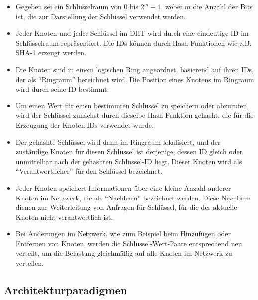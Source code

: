 \documentclass[../vs-script-first-v01.tex]{subfiles}
\begin{document}
\begin{itemize}
\item Gegeben sei ein Schlüsselraum von $0$ bis $2^m - 1$, wobei $m$ die Anzahl der Bits ist, die zur Darstellung der Schlüssel verwendet werden.
\item Jeder Knoten und jeder Schlüssel im DHT wird durch eine eindeutige ID im Schlüsselraum repräsentiert. Die IDs können durch Hash-Funktionen wie z.B. SHA-1 erzeugt werden.
\item Die Knoten sind in einem logischen Ring angeordnet, basierend auf ihren IDs, der als \enquote{Ringraum} bezeichnet wird. Die Position eines Knotens im Ringraum wird durch seine ID bestimmt.
\item Um einen Wert für einen bestimmten Schlüssel zu speichern oder abzurufen, wird der Schlüssel zunächst durch dieselbe Hash-Funktion gehasht, die für die Erzeugung der Knoten-IDs verwendet wurde.
\item Der gehashte Schlüssel wird dann im Ringraum lokalisiert, und der zuständige Knoten für diesen Schlüssel ist derjenige, dessen ID gleich oder unmittelbar nach der gehashten Schlüssel-ID liegt. Dieser Knoten wird als \enquote{Verantwortlicher} für den Schlüssel bezeichnet.
\item Jeder Knoten speichert Informationen über eine kleine Anzahl anderer Knoten im Netzwerk, die als \enquote{Nachbarn} bezeichnet werden. Diese Nachbarn dienen zur Weiterleitung von Anfragen für Schlüssel, für die der aktuelle Knoten nicht verantwortlich ist.
\item Bei Änderungen im Netzwerk, wie zum Beispiel beim Hinzufügen oder Entfernen von Knoten, werden die Schlüssel-Wert-Paare entsprechend neu verteilt, um die Belastung gleichmäßig auf alle Knoten im Netzwerk zu verteilen.
\end{itemize}

\newpage
\label{Woche03}\subsection{Architekturparadigmen}
\end{document}
